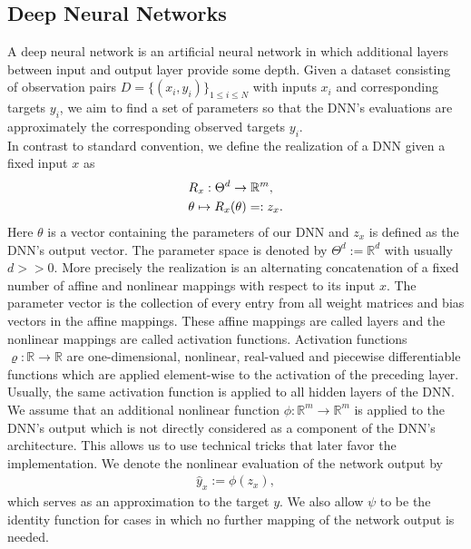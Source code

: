 \documentclass[conference]{IEEEtran}
\begin{document}
	\subsection{Deep Neural Networks}
	\noindent
	A deep neural network is an artificial neural network in which additional layers between input and output layer provide some depth. Given a dataset consisting of observation pairs $D =\{(x_{i}, y_{i})\}_{1\leq i\leq N}$ with inputs $x_{i}$ and corresponding targets $y_{i}$, we aim to find a set of parameters so
	that the DNN's evaluations are approximately the corresponding observed targets $y_{i}$.\\
	In contrast to standard convention, we define the realization of a DNN given a fixed input $x$ as
	\begin{align}
	&R_{x}:\Theta^{d}\rightarrow\mathbb{R}^{m}, \notag\\
	&\theta\mapsto R_{x}(\theta) =: z_{x}.
	\end{align}
	Here $\theta$ is a vector containing the parameters of our DNN and $z_{x}$ is defined as the DNN's output vector. The parameter space is denoted by $\Theta^{d} := \mathbb{R}^{d}$ with usually $d>>0$. More precisely the realization is an alternating concatenation 
	of a fixed number of affine and nonlinear mappings with respect to its input $x$. The parameter vector is the collection of every entry from all weight matrices and bias vectors in the affine mappings. These affine mappings are called layers and the nonlinear mappings are called activation functions. Activation functions $\varrho:\mathbb{R}\rightarrow\mathbb{R}$ are one-dimensional, nonlinear, real-valued and piecewise differentiable functions which are applied element-wise to the activation of the preceding layer. Usually, the same activation function is applied to all hidden layers of the DNN. We assume that an additional nonlinear function $\phi:\mathbb{R}^{m}\rightarrow\mathbb{R}^{m}$ is applied to the DNN's output which is not directly considered as a component of the DNN's architecture. This allows us to use technical tricks that later favor the implementation. We denote the nonlinear evaluation of the network output by
	\begin{align}
	\hat{y}_{x} := \phi(z_{x}),
	\end{align}
	which serves as an approximation to
	the target $y$. We also allow $\psi$ to be the identity function for cases in which no further mapping of the network output is needed.
\end{document}

